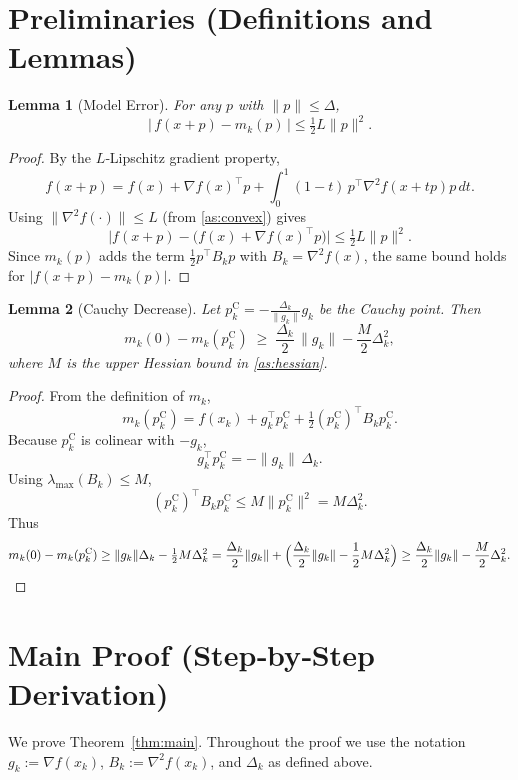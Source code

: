 \documentclass{article}
\newtheorem{lemma}{Lemma}
\begin{document}
\section*{Preliminaries (Definitions and Lemmas)}
\begin{lemma}[Model Error]\label{lem:model}
For any $p$ with $\|p\|\le\Delta$,
\[
\bigl|\,f(x+p)-m_{k}(p)\,\bigr|\le \tfrac12 L\|p\|^{2}.
\tag{L1}
\]
\end{lemma}
\begin{proof}
By the $L$‑Lipschitz gradient property,
\[
f(x+p)=f(x)+\nabla f(x)^{\top}p+\int_{0}^{1}(1-t)\,p^{\top}\nabla^{2}f(x+tp)p\,dt .
\]
Using $ \|\nabla^{2}f(\cdot)\|\le L$ (from \ref{as:convex}) gives
\[
\bigl|f(x+p)-\bigl(f(x)+\nabla f(x)^{\top}p\bigr)\bigr|
\le \tfrac12 L\|p\|^{2}.
\]
Since $m_{k}(p)$ adds the term $\tfrac12 p^{\top}B_{k}p$ with $B_{k}=\nabla^{2}f(x)$,
the same bound holds for $|f(x+p)-m_{k}(p)|$.
\end{proof}

\begin{lemma}[Cauchy Decrease]\label{lem:cauchy}
Let $p^{\mathrm{C}}_{k}= -\frac{\Delta_{k}}{\|g_{k}\|}g_{k}$ be the Cauchy point.
Then
\[
m_{k}(0)-m_{k}(p^{\mathrm{C}}_{k})\;\ge\;
\frac{\Delta_{k}}{2}\,\|g_{k}\| -\frac{M}{2}\Delta_{k}^{2},
\tag{L2}
\]
where $M$ is the upper Hessian bound in \ref{as:hessian}.
\end{lemma}
\begin{proof}
From the definition of $m_{k}$,
\[
m_{k}(p^{\mathrm{C}}_{k})=f(x_{k})+g_{k}^{\top}p^{\mathrm{C}}_{k}
+\tfrac12(p^{\mathrm{C}}_{k})^{\top}B_{k}p^{\mathrm{C}}_{k}.
\]
Because $p^{\mathrm{C}}_{k}$ is colinear with $-g_{k}$,
\[
g_{k}^{\top}p^{\mathrm{C}}_{k}= -\|g_{k}\|\,\Delta_{k}.
\]
Using $\lambda_{\max}(B_{k})\le M$,
\[
(p^{\mathrm{C}}_{k})^{\top}B_{k}p^{\mathrm{C}}_{k}
\le M\|p^{\mathrm{C}}_{k}\|^{2}=M\Delta_{k}^{2}.
\]
Thus
\[
m_{k}(0)-m_{k}(p^{\mathrm{C}}_{k})
\ge \|g_{k}\|\Delta_{k} -\tfrac12 M\Delta_{k}^{2}
= \frac{\Delta_{k}}{2}\|g_{k}\| +\Bigl(\frac{\Delta_{k}}{2}\|g_{k}\|- \frac12 M\Delta_{k}^{2}\Bigr)
\ge \frac{\Delta_{k}}{2}\|g_{k}\| -\frac{M}{2}\Delta_{k}^{2}.
\]
\end{proof}

\section*{Main Proof (Step‑by‑Step Derivation)}
We prove Theorem~\ref{thm:main}.  Throughout the proof we use the notation
$g_{k}:=\nabla f(x_{k})$, $B_{k}:=\nabla^{2}f(x_{k})$, and $\Delta_{k}$ as defined
above.
\end{document}
